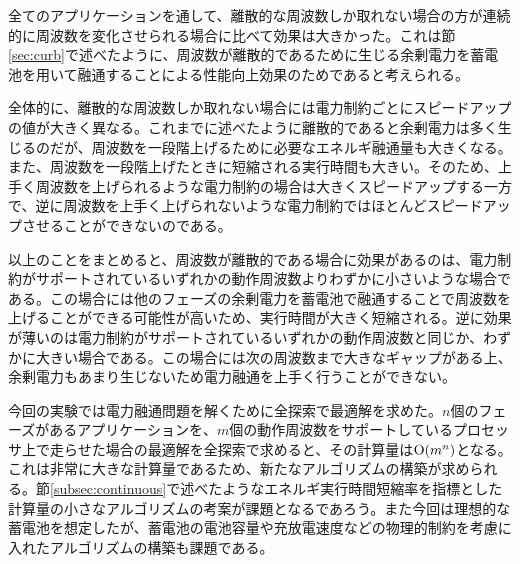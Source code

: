 全てのアプリケーションを通して、離散的な周波数しか取れない場合の方が連続的に周波数を変化させられる場合に比べて効果は大きかった。これは節\ref{sec:curb}で述べたように、周波数が離散的であるために生じる余剰電力を蓄電池を用いて融通することによる性能向上効果のためであると考えられる。

全体的に、離散的な周波数しか取れない場合には電力制約ごとにスピードアップの値が大きく異なる。これまでに述べたように離散的であると余剰電力は多く生じるのだが、周波数を一段階上げるために必要なエネルギ融通量も大きくなる。また、周波数を一段階上げたときに短縮される実行時間も大きい。そのため、上手く周波数を上げられるような電力制約の場合は大きくスピードアップする一方で、逆に周波数を上手く上げられないような電力制約ではほとんどスピードアップさせることができないのである。

以上のことをまとめると、周波数が離散的である場合に効果があるのは、電力制約がサポートされているいずれかの動作周波数よりわずかに小さいような場合である。この場合には他のフェーズの余剰電力を蓄電池で融通することで周波数を上げることができる可能性が高いため、実行時間が大きく短縮される。逆に効果が薄いのは電力制約がサポートされているいずれかの動作周波数と同じか、わずかに大きい場合である。この場合には次の周波数まで大きなギャップがある上、余剰電力もあまり生じないため電力融通を上手く行うことができない。

今回の実験では電力融通問題を解くために全探索で最適解を求めた。$n$個のフェーズがあるアプリケーションを、$m$個の動作周波数をサポートしているプロセッサ上で走らせた場合の最適解を全探索で求めると、その計算量は${\rm O}(m^n)$となる。これは非常に大きな計算量であるため、新たなアルゴリズムの構築が求められる。節\ref{subsec:continuous}で述べたようなエネルギ実行時間短縮率を指標とした計算量の小さなアルゴリズムの考案が課題となるであろう。また今回は理想的な蓄電池を想定したが、蓄電池の電池容量や充放電速度などの物理的制約を考慮に入れたアルゴリズムの構築も課題である。










